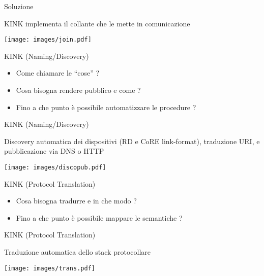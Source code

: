 \documentclass{beamer}
\begin{document}
\begin{frame}{Soluzione}
\begin{center}
KINK implementa il collante che le mette in comunicazione
\end{center}
\pause
\begin{center}
  \texttt{[image: images/join.pdf]}
\end{center}
\end{frame}

\begin{frame}{KINK (Naming/Discovery)}
\begin{itemize}
  \pause
  \item Come chiamare le ``cose'' ?
  \pause
  \item Cosa bisogna rendere pubblico e come ?
  \pause
  \item Fino a che punto \`e possibile automatizzare le procedure ?
\end{itemize}
\end{frame}

\begin{frame}{KINK (Naming/Discovery)}
\begin{center}
Discovery automatica dei dispositivi (RD e CoRE link-format), traduzione URI, e pubblicazione via DNS o HTTP
\end{center}
\pause
\begin{center}
  \texttt{[image: images/discopub.pdf]}
\end{center}
\end{frame}

\begin{frame}{KINK (Protocol Translation)}
\begin{itemize}
  \pause
  \item Cosa bisogna tradurre e in che modo ?
  \pause
  \item Fino a che punto \`e possibile mappare le semantiche ?
\end{itemize}
\end{frame}

\begin{frame}{KINK (Protocol Translation)}
\begin{center}
Traduzione automatica dello stack protocollare
\end{center}
\pause
\begin{center}
  \texttt{[image: images/trans.pdf]}
\end{center}
\end{frame}
\end{document}

